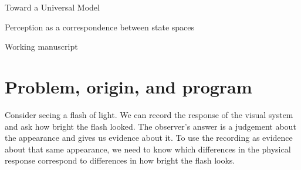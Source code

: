 \documentclass[11pt]{article}
\theoremstyle{definition}
\begin{document}
\begin{center}
{\LARGE Toward a Universal Model\par}
\smallskip
{\large Perception as a correspondence between state spaces\par}
\smallskip
Working manuscript
\end{center}
\begin{abstract}
\noindent
We model perception by a linear map from physical states to a space of appearances. Its polar part pairs measurements with equal Born probabilities. For a self-adjoint system, the complete response through a bounded reciprocal port determines the Hamiltonian and port on the reached space up to unitary equivalence. In a fermion pair, each of two preparation settings has a plane as its range. The two planes span the three-dimensional carrier. The measured weight of one spectral line fixes the excitation's geometric phase over a cycle. We use a five-site model to follow an observer from seeing a vessel to judging that it is a jug. The judgement changes the probability of a specified return to the physical sector, although each successful return gives the same physical state. For a fixed pairing, canonical relaxation toward the ground preserves paired states exactly when that ground has a physical partner. The corresponding physical relaxation on the active input space is then unique. We assign the same phenomenal ground state to two stages of contemplative realization. On our reading of Ratn\=akara\'s\=anti, undifferentiated luminosity still appears at the Third Yoga after the distinction between grasper and grasped has fallen away. At the Fourth even this appearance ceases. How to represent its cessation remains open. The conjecture of asymmetric nonduality says that every physical state has a norm-preserving presentation and that some possible appearance is orthogonal to every admissible physical presentation. Assessing it requires independent grounds for which preparations count.
\end{abstract}

\part{Problem, origin, and program}
\label{part:problem-origin}

Consider seeing a flash of light. We can record the response of the visual system and ask how bright the flash looked. The observer's answer is a judgement about the appearance and gives us evidence about it. To use the recording as evidence about that same appearance, we need to know which differences in the physical response correspond to differences in how bright the flash looks.
\end{document}
